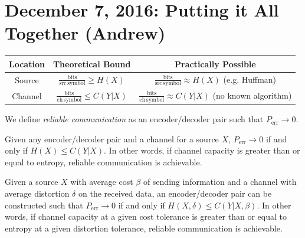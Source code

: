 \documentclass[11pt]{article}
\theoremstyle{definition}
\begin{document}
\section{December 7, 2016: Putting it All Together (Andrew)}
\begin{table}[h]
	\begin{tabular}{|c|c|c|}
		\hline
		 Location & Theoretical Bound & Practically Possible \\
		 \hline
		 Source & $\frac{\mathrm{bits}}{\mathrm{src \, symbol}} \geq H(X)$ & $\frac{\mathrm{bits}}{\mathrm{src \, symbol}} \approx H(X)$ (e.g. Huffman)\\
		 \hline
		 Channel & $\frac{\mathrm{bits}}{\mathrm{ch \, symbol}} \leq C(Y|X)$ & $\frac{\mathrm{bits}}{\mathrm{ch \, symbol}} \approx C(Y|X)$ (no known algorithm)\\
		 \hline
	\end{tabular}
\end{table}

We define {\it reliable communication} as an encoder/decoder pair such that $P_{\mathrm{err}} \to 0$.

 Given any encoder/decoder pair and a channel for a source $X$, $P_{\mathrm{err}} \to 0$ if and only if $H(X) \leq C(Y|X)$. In other words, if channel capacity is greater than or equal to entropy, reliable communication is achievable.

 Given a source $X$ with average cost $\beta$ of sending information and a channel with average distortion $\delta$ on the received data, an encoder/decoder pair can be constructed such that $P_{\mathrm{err}} \to 0$ if and only if $H(X, \delta) \leq C(Y|X, \beta)$. In other words, if channel capacity at a given cost tolerance is greater than or equal to entropy at a given distortion tolerance, reliable communication is achievable.
\newpage
\end{document}
